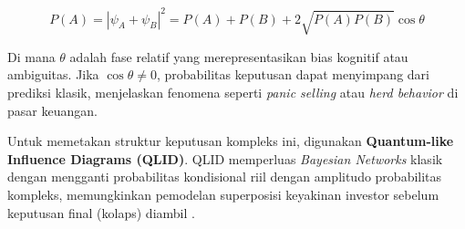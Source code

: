 \[ P(A) = | \psi_A + \psi_B |^2 = P(A) + P(B) + 2\sqrt{P(A)P(B)} \cos \theta \]

Di mana $\theta$ adalah fase relatif yang merepresentasikan bias kognitif atau ambiguitas. Jika $\cos \theta \neq 0$, probabilitas keputusan dapat menyimpang dari prediksi klasik, menjelaskan fenomena seperti \textit{panic selling} atau \textit{herd behavior} di pasar keuangan. 

Untuk memetakan struktur keputusan kompleks ini, digunakan \textbf{Quantum-like Influence Diagrams (QLID)}. QLID memperluas \textit{Bayesian Networks} klasik dengan mengganti probabilitas kondisional riil dengan amplitudo probabilitas kompleks, memungkinkan pemodelan superposisi keyakinan investor sebelum keputusan final (kolaps) diambil \citep{moreira_quantum-like_2020}.